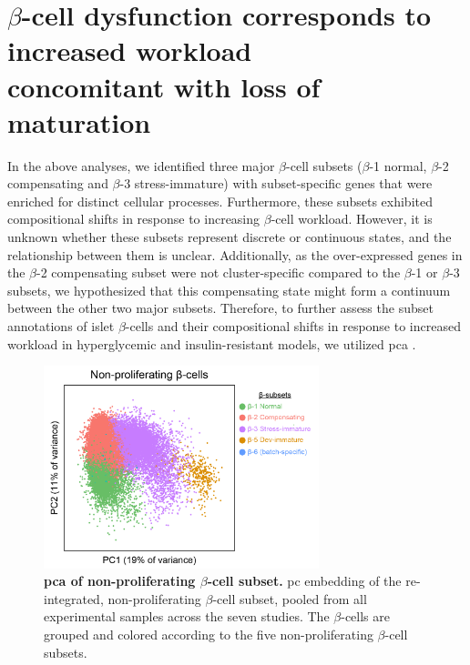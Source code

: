 
\section[$\beta$-cell dysfunction corresponds to increased workload concomitant with loss of maturation]{$\beta$-cell dysfunction corresponds to increased workload\\concomitant with loss of maturation}
\label{sec:chp3_betaPCA}

In the above analyses, we identified three major $\beta$-cell subsets ($\beta$-1 normal, $\beta$-2 compensating and $\beta$-3 stress-immature) with subset-specific genes that were enriched for distinct cellular processes. Furthermore, these subsets exhibited compositional shifts in response to increasing $\beta$-cell workload. However, it is unknown whether these subsets represent discrete or continuous states, and the relationship between them is unclear. Additionally, as the over-expressed genes in the $\beta$-2 compensating subset were not cluster-specific compared to the $\beta$-1 or $\beta$-3 subsets, we hypothesized that this compensating state might form a continuum between the other two major subsets. Therefore, to further assess the subset annotations of islet $\beta$-cells and their compositional shifts in response to increased workload in hyperglycemic and insulin-resistant models, we utilized \gls{pca} \textbf{\cite{pearson_lines_1901}}.\\



\begin{figure}
\includegraphics[width=8cm]{Chapter5/Fig/F3-6-01.png}
\caption[ of non-proliferating $\beta$-cell subsets]{\textbf{\gls{pca} of non-proliferating $\beta$-cell subset.} \gls{pc} embedding of the re-integrated, non-proliferating $\beta$-cell subset, pooled from all experimental samples across the seven studies. The $\beta$-cells are grouped and colored according to the five non-proliferating $\beta$-cell subsets.}
\label{fig:chp3_pca}
\end{figure}

